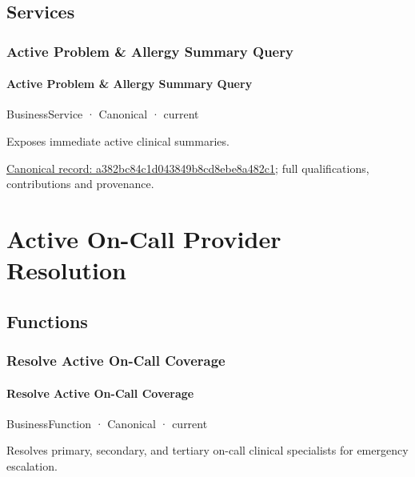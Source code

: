 \subsection{Services}

\subsubsection{Active Problem \& Allergy Summary Query}

\paragraph{Active Problem \& Allergy Summary Query}

\label{element:a382bc84c1d043849b8cd8ebe8a482c1}
{\small BusinessService · Canonical · current}\par

Exposes immediate active clinical summaries.


{\footnotesize \href{../../../../continuum/business/business-service/a382bc84c1d043849b8cd8ebe8a482c1.md}{Canonical record: a382bc84c1d043849b8cd8ebe8a482c1}; full qualifications, contributions and provenance.}\par
\section{Active On-Call Provider Resolution}

\subsection{Functions}

\subsubsection{Resolve Active On-Call Coverage}

\paragraph{Resolve Active On-Call Coverage}

\label{element:a88d3779091140c6b90f98d550b5387f}
{\small BusinessFunction · Canonical · current}\par

Resolves primary, secondary, and tertiary on-call clinical specialists for emergency escalation.


